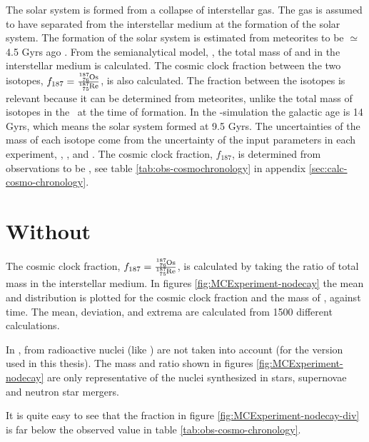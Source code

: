 The solar system is formed from a collapse of interstellar gas.
The gas is assumed to have separated from the interstellar medium at the formation of the solar system.
The formation of the solar system is estimated from meteorites to be $\simeq$ 4.5 Gyrs ago .
From the semianalytical model, \omegamodel, the total mass of  and  in the interstellar medium is calculated.
The cosmic clock fraction between the two isotopes, $f_{187} = \frac{\os{187}}{\re{187}}$, is also calculated.
The fraction between the isotopes is relevant because it can be determined from meteorites, unlike the total mass of isotopes in the \sos\ at the time of formation.
In the \eris-simulation the galactic age is 14 Gyrs, which means the solar system formed at 9.5 Gyrs.
The uncertainties of the mass of each isotope come from the uncertainty of the input parameters in each experiment, \expone, \exptwo, and \expthree.
The cosmic clock fraction, $f_{187}$, is determined from observations to be , see table \ref{tab:obs-cosmochronology} in appendix \ref{sec:calc-cosmo-chronology}.


\section{Without \betadecay}
\label{sec:results-nodecay}
\setlength{\subfigwidth}{0.40\textwidth}
\setlength{\figwidth}{0.6\textwidth}
The cosmic clock fraction, $f_{187} = \frac{\os{187}}{\re{187}}$, is calculated by taking the ratio of total mass in the interstellar medium.
In figures \ref{fig:MCExperiment-nodecay} the mean and distribution is plotted for the cosmic clock fraction and the mass of ,  against time.
The mean, deviation, and extrema are calculated from 1500 different calculations.

In \omegamodel, \betadecay from radioactive nuclei (like ) are not taken into account (for the version used in this thesis).
The mass and ratio shown in figures \ref{fig:MCExperiment-nodecay} are only representative of the nuclei synthesized in stars, supernovae and neutron star mergers.

It is quite easy to see that the fraction in figure \ref{fig:MCExperiment-nodecay-div} is far below the observed value in table \ref{tab:obs-cosmo-chronology}.

